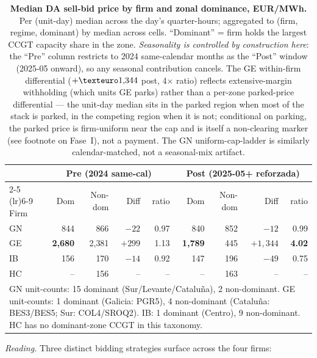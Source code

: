 \documentclass[11pt,a4paper]{article}
\begin{document}
\begin{table}[H]
\centering
\caption{\textbf{Median DA sell-bid price by firm and zonal dominance, EUR/MWh.} Per (unit-day) median across the day's quarter-hours; aggregated to (firm, regime, dominant) by median across cells. ``Dominant'' = firm holds the largest CCGT capacity share in the zone. \emph{\color{seasoncol}Seasonality is controlled by construction here}: the ``Pre'' column restricts to 2024 same-calendar months as the ``Post'' window (2025-05 onward), so any seasonal contribution cancels. The GE within-firm differential ($+\texteuro 1{,}344$ post, 4$\times$ ratio) reflects extensive-margin withholding (which units GE parks) rather than a per-zone parked-price differential --- the unit-day median sits in the parked region when most of the stack is parked, in the competing region when it is not; conditional on parking, the parked price is firm-uniform near the cap and is itself a non-clearing marker (see footnote on Fase~I), not a payment. The GN uniform-cap-ladder is similarly calendar-matched, not a seasonal-mix artifact.}
\label{tab:bid_by_zonal_dominance}
\setlength{\tabcolsep}{6pt}
\begin{tabular}{l r r r r r r r r}
\toprule
 & \multicolumn{4}{c}{Pre (2024 same-cal)} & \multicolumn{4}{c}{Post (2025-05+ reforzada)} \\
 \cmidrule(lr){2-5} \cmidrule(lr){6-9}
Firm & Dom & Non-dom & Diff & ratio & Dom & Non-dom & Diff & ratio \\
\midrule
GN & 844 & 866 & $-22$ & 0.97 & 840 & 852 & $-12$ & 0.99 \\
GE & \textbf{2{,}680} & 2{,}381 & $+299$ & 1.13 & \textbf{1{,}789} & 445 & \textbf{$+1{,}344$} & \textbf{4.02} \\
IB & 156 & 170 & $-14$ & 0.92 & 147 & 196 & $-49$ & 0.75 \\
HC & -- & 156 & -- & -- & -- & 163 & -- & -- \\
\bottomrule
\multicolumn{9}{p{14.5cm}}{\footnotesize{GN unit-counts: 15 dominant (Sur/Levante/Cataluña), 2 non-dominant. GE unit-counts: 1 dominant (Galicia: PGR5), 4 non-dominant (Cataluña: BES3/BES5; Sur: COL4/SROQ2). IB: 1 dominant (Centro), 9 non-dominant. HC has no dominant-zone CCGT in this taxonomy.}}
\end{tabular}
\end{table}

\textit{Reading.} Three distinct bidding strategies surface across the four firms:
\end{document}
